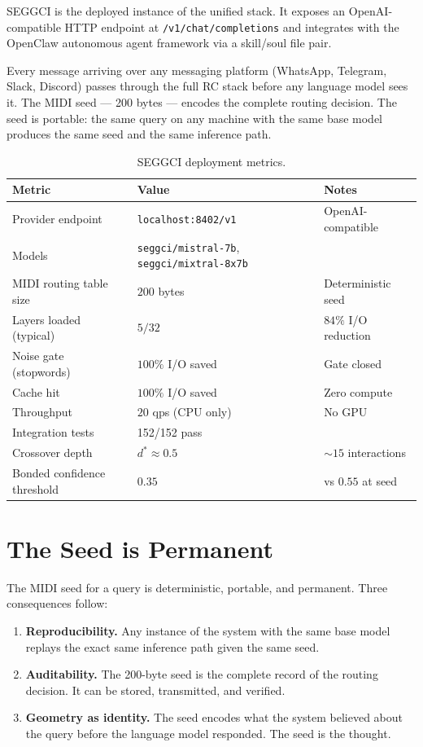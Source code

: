 \documentclass[11pt,twoside]{article}
\theoremstyle{plain}
\theoremstyle{definition}
\theoremstyle{remark}
\begin{document}
SEGGCI is the deployed instance of the unified stack.  It exposes an
OpenAI-compatible HTTP endpoint at \texttt{/v1/chat/completions} and integrates
with the OpenClaw autonomous agent framework via a skill/soul file pair.

Every message arriving over any messaging platform (WhatsApp, Telegram, Slack,
Discord) passes through the full RC stack before any language model sees it.
The MIDI seed --- 200 bytes --- encodes the complete routing decision.  The
seed is portable: the same query on any machine with the same base model
produces the same seed and the same inference path.

\begin{table}[h!]
\centering\small
\caption{SEGGCI deployment metrics.}
\begin{tabular}{lll}
\toprule
Metric & Value & Notes \\
\midrule
Provider endpoint & \texttt{localhost:8402/v1} & OpenAI-compatible \\
Models & \texttt{seggci/mistral-7b}, \texttt{seggci/mixtral-8x7b} & \\
MIDI routing table size & $200$ bytes & Deterministic seed \\
Layers loaded (typical) & $5/32$ & $84\%$ I/O reduction \\
Noise gate (stopwords) & $100\%$ I/O saved & Gate closed \\
Cache hit & $100\%$ I/O saved & Zero compute \\
Throughput & $20$ qps (CPU only) & No GPU \\
Integration tests & 152/152 pass & \\
Crossover depth & $d^*\approx 0.5$ & $\sim 15$ interactions \\
Bonded confidence threshold & $0.35$ & vs $0.55$ at seed \\
\bottomrule
\end{tabular}
\end{table}

\section{The Seed is Permanent}

The MIDI seed for a query is deterministic, portable, and permanent.  Three
consequences follow:

\begin{enumerate}
\item \textbf{Reproducibility.}  Any instance of the system with the same base
  model replays the exact same inference path given the same seed.
\item \textbf{Auditability.}  The 200-byte seed is the complete record of the
  routing decision.  It can be stored, transmitted, and verified.
\item \textbf{Geometry as identity.}  The seed encodes what the system
  believed about the query before the language model responded.  The seed is
  the thought.
\end{enumerate}
\end{document}
